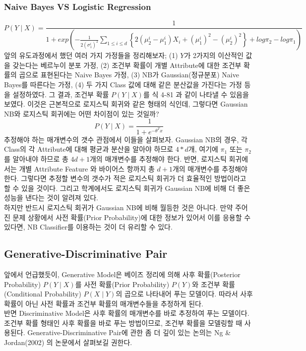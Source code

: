 \documentclass[a4paper]{oblivoir}
\begin{document}
\subsubsection{Naive Bayes VS Logistic Regression}
\begin{equation}
P(Y \mid X) = \frac{1}{1+exp\left( -\frac{1}{2(\sigma_{1}^{i})^{2}}\sum_{1 \leq i \leq d}\left\{ 2(\mu_{2}^{i} - \mu_{1}^{i})X_{i}+(\mu_{1}^{i})^{2} - (\mu_{2}^{i})^{2} \right\} +log\pi_{2} - log\pi_{1} \right)} \tag{4-81}
\end{equation}
\indent 앞의 유도과정에서 했던 여러 가지 가정들을 정리해보자; (1) $Y$가 2가지의 이산적인 값을 갖는다는 베르누이 분포 가정, (2) 조건부 확률이 개별 Attribute에 대한 조건부 확률의 곱으로 표현된다는 Naive Bayes 가정, (3) NB가 Gaussian(정규분포) Naive Bayes를 따른다는 가정, (4) 두 가지 Class 값에 대해 같은 분산값을 가진다는 가정 등을 설정하였다. 그 결과, 조건부 확률 $P(Y \mid X)$를 식 4-81 과 같이 나타낼 수 있음을 보였다. 이것은 근본적으로 로지스틱 회귀와 같은 형태의 식인데, 그렇다면 Gaussian NB와 로지스틱 회귀에는 어떤 차이점이 있는 것일까?\\
\begin{equation}
P(Y \mid X) = \frac{1}{1+e^{-\theta^{T}x}} \tag{4-82}
\end{equation}
\indent 	추정해야 하는 매개변수의 갯수 관점에서 이들을 살펴보자. Gaussian NB의 경우, 각 Class의 각 Attribute에 대해 평균과 분산을 알아야 하므로 $4*d$개, 여기에 $\pi_{1}$ 또는 $\pi_{2}$를 알아내야 하므로 총 $4d+1$개의 매개변수를 추정해야 한다. 반면, 로지스틱 회귀에서는 개별 Attribute Feature 와 바이어스 항까지 총 $d+1$개의 매개변수를 추정해야 한다. 그렇다면 추정할 변수의 갯수가 적은 로지스틱 회귀가 더 효율적인 방법이라고 할 수 있을 것이다. 그리고 학계에서도 로지스틱 회귀가 Gaussian NB에 비해 더 좋은 성능을 낸다는 것이 알려져 있다. \\
\indent 하지만 반드시 로지스틱 회귀가 Gaussian NB에 비해 월등한 것은 아니다. 만약 주어진 문제 상황에서 사전 확률(Prior Probability)에 대한 정보가 있어서 이를 응용할 수 있다면, NB Classifier를 이용하는 것이 더 유리할 수 있다.

\subsection{Generative-Discriminative Pair}
앞에서 언급했듯이, Generative Model은 베이즈 정리에 의해 사후 확률(Posterior Probability) $P(Y \mid X)$를 사전 확률(Prior Probability) $P(Y)$와 조건부 확률(Conditional Probability) $P(X \mid Y)$의 곱으로 나타내어 푸는 모델이다. 따라서 사후 확률이 아닌 사전 확률과 조건부 확률의 매개변수들을 추정하게 된다. \\
\indent 반면 Discriminative Model은 사후 확률의 매개변수를 바로 추정하여 푸는 모델이다. 조건부 확률 형태인 사후 확률을 바로 푸는 방법이므로, 조건부 확률을 모델링할 때 사용된다. Generative-Discriminative Pair에 관한 좀 더 깊이 있는 논의는 Ng \& Jordan(2002) 의 논문에서 살펴보길 권한다.
\end{document}
